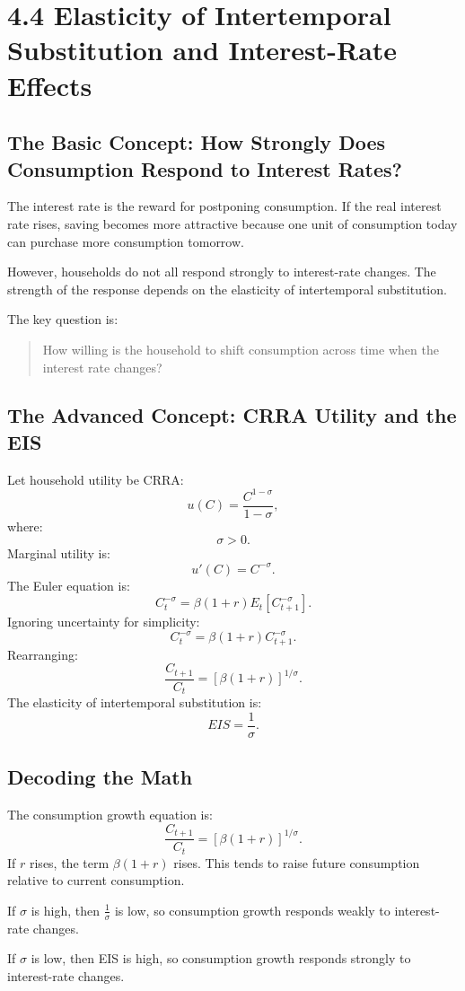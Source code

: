 \documentclass[12pt,a4paper]{article}
\begin{document}
\section*{4.4 Elasticity of Intertemporal Substitution and Interest-Rate Effects}
\subsection*{The Basic Concept: How Strongly Does Consumption Respond to Interest Rates?}
The interest rate is the reward for postponing consumption. If the real interest rate rises, saving becomes more attractive because one unit of consumption today can purchase more consumption tomorrow.

However, households do not all respond strongly to interest-rate changes. The strength of the response depends on the elasticity of intertemporal substitution.

The key question is:
\begin{quote}
How willing is the household to shift consumption across time when the interest rate changes?
\end{quote}

\subsection*{The Advanced Concept: CRRA Utility and the EIS}
Let household utility be CRRA:
\[ u(C) = \frac{C^{1-\sigma}}{1-\sigma}, \]
where:
\[ \sigma > 0. \]
Marginal utility is:
\[ u'(C) = C^{-\sigma}. \]
The Euler equation is:
\[ C_t^{-\sigma} = \beta(1+r)E_t[C_{t+1}^{-\sigma}]. \]
Ignoring uncertainty for simplicity:
\[ C_t^{-\sigma} = \beta(1+r)C_{t+1}^{-\sigma}. \]
Rearranging:
\[ \frac{C_{t+1}}{C_t} = [\beta(1+r)]^{1/\sigma}. \]
The elasticity of intertemporal substitution is:
\[ EIS = \frac{1}{\sigma}. \]

\subsection*{Decoding the Math}
The consumption growth equation is:
\[ \frac{C_{t+1}}{C_t} = [\beta(1+r)]^{1/\sigma}. \]
If $r$ rises, the term $\beta(1+r)$ rises. This tends to raise future consumption relative to current consumption.

If $\sigma$ is high, then $\frac{1}{\sigma}$ is low, so consumption growth responds weakly to interest-rate changes.

If $\sigma$ is low, then EIS is high, so consumption growth responds strongly to interest-rate changes.
\end{document}
